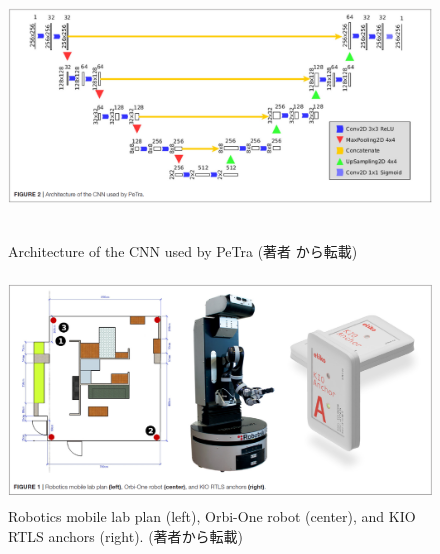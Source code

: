 \begin{figure}[h]
  \begin{center}
  \includegraphics[height=70mm,clip]{figure/2-4_cnn.png}
  \caption{Architecture of the CNN used by PeTra (著者
  \cite{Tracking People in a Mobile Robot From 2D LIDAR Scans Using Full Convolutional Neural Networks for Security in Cluttered Environments}から転載)}
  \label{2-4_cnn}
  \end{center}
\end{figure}

\begin{figure}[h]
  \begin{center}
  \includegraphics[height=60mm,clip]{figure/2-4_env.png}
  \caption{Robotics mobile lab plan (left), Orbi-One robot (center), and KIO RTLS anchors (right).
  (著者\cite{Tracking People in a Mobile Robot From 2D LIDAR Scans Using Full Convolutional Neural Networks for Security in Cluttered Environments}から転載)}
  \label{2-4_env}
  \end{center}
\end{figure}

